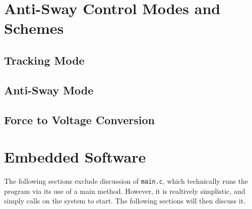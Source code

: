 \documentclass[letterpaper]{article}
\begin{document}
\newpage

\section{Anti-Sway Control Modes and Schemes}
\subsection{Tracking Mode}
\subsection{Anti-Sway Mode}
\subsection{Force to Voltage Conversion}

\newpage

\section{Embedded Software} \label{section-emb-soft}
The following sections exclude discussion of \texttt{main.c}, which technically runs the program via its use of a main method. However, it is realtively simplistic, and simply calls on the system to start. The following sections will then discuss it.
\end{document}
